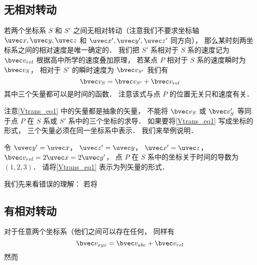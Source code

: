


\subsection{无相对转动}
若两个坐标系 $S$ 和 $S'$ 之间无相对转动（注意我们不要求坐标轴 $\uvec x, \uvec y, \uvec z$ 和 $\uvec x', \uvec y', \uvec z'$ 同方向）， 那么某时刻两坐标系之间的相对速度是唯一确定的． 我们把 $S'$ 系相对于 $S$ 系的速度记为 $\bvec v_{rel}$ 根据高中所学的速度叠加原理， 若某点 $P$ 相对于 $S$ 系的速度瞬时为 $\bvec v_S$， 相对于 $S'$ 的瞬时速度为 $\bvec v_{S'}$ 我们有
\begin{equation}\label{Vtrans_eq1}
\bvec v_{S} = \bvec v_{S'} + \bvec v_{rel}
\end{equation}
其中三个矢量都可以是时间的函数． 注意该式与点 $P$ 的位置无关只和速度有关．

注意\autoref{Vtrans_eq1} 中的矢量都是抽象的矢量， 不能将 $\bvec v_S$ 或 $\bvec v_S'$ 等同于点 $P$ 在 $S$ 系或 $S'$ 系中的三个坐标的求导． 如果要将\autoref{Vtrans_eq1} 写成坐标的形式， 三个矢量必须在同一坐标系中表示． 我们来举例说明．

\begin{example}{}
令 $\uvec y' = \uvec x$， $\uvec z' = \uvec y$， $\uvec x' = \uvec z$， $\bvec v_{rel} = 2\uvec x = 2\uvec y'$， 点 $P$ 在 $S$ 系中的坐标关于时间的导数为 $(1, 2, 3)$． 请将\autoref{Vtrans_eq1} 表示为列矢量的形式．

我们先来看错误的理解： 若将 $$
\end{example}

\subsection{有相对转动}
对于任意两个坐标系（他们之间可以存在任何， 同样有
\begin{equation}
\bvec v_{xyz} = \bvec v_{abc} + \bvec v_{rel}
\end{equation}
然而
